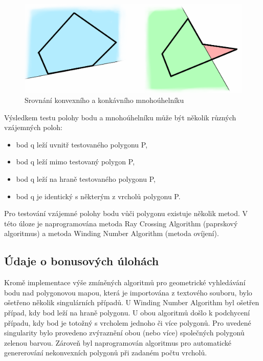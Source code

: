 \documentclass[a4paper,11pt,twoside]{article}
\begin{document}
\vspace{0.2cm}
\begin{figure}[hbt!] 
\begin{center}
\includegraphics[width=15cm]{pictures/Srovnani-konvex.png} 
\caption[Srovnání konvexního a nekonvexního (konkávního) mnohoúhelníku]{Srovnání konvexního a konkávního mnohoúhelníku \cite{srovnani_konvex}}
\label{fig:srovnani_konvex}
\end{center}
\end{figure}
\vspace{-0.4cm}

\noindent
\large
Výsledkem testu polohy bodu a mnohoúhelníku může být několik různých vzájemných poloh:
\begin{itemize}
		\item bod q leží uvnitř testovaného polygonu P,
		\item bod q leží mimo testovaný polygon P,
		\item bod q leží na hraně testovaného polygonu P,
		\item bod q je identický s některým z vrcholů polygonu P.
\end{itemize}

Pro testování vzájemné polohy bodu vůči polygonu existuje několik metod. V této úloze je naprogramována metoda Ray Crossing Algorithm (paprskový algoritmus) a metoda Winding Number Algorithm (metoda ovíjení).

\subsection{Údaje o bonusových úlohách}
\large
\noindent Kromě implementace výše zmíněných algoritmů pro geometrické vyhledávání bodu nad polygonovou mapou, která je importována z textového souboru, bylo ošetřeno několik singulárních případů. U Winding Number Algorithm byl ošetřen případ, kdy bod leží na hraně polygonu. U obou algoritmů došlo k podchycení případu, kdy bod je totožný s vrcholem jednoho či více polygonů. Pro uvedené singularity bylo provedeno zvýraznění obou (nebo více) společných polygonů zelenou barvou. Zároveň byl naprogramován algoritmus pro automatické genererování nekonvexních polygonů při zadaném počtu vrcholů. 
\end{document}
